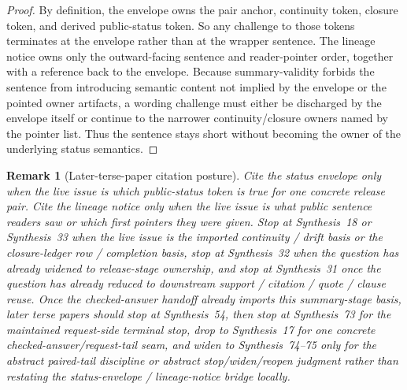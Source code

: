 \documentclass[11pt]{article}
\newtheorem{remark}{Remark}
\begin{document}
\begin{proof}
By definition, the envelope owns the pair anchor, continuity token, closure token, and derived public-status token.
So any challenge to those tokens terminates at the envelope rather than at the wrapper sentence.
The lineage notice owns only the outward-facing sentence and reader-pointer order, together with a reference back to the envelope.
Because summary-validity forbids the sentence from introducing semantic content not implied by the envelope or the pointed owner artifacts, a wording challenge must either be discharged by the envelope itself or continue to the narrower continuity/closure owners named by the pointer list.
Thus the sentence stays short without becoming the owner of the underlying status semantics.
\end{proof}

\begin{remark}[Later-terse-paper citation posture]
Cite the status envelope only when the live issue is \emph{which public-status token is true} for one concrete release pair.
Cite the lineage notice only when the live issue is \emph{what public sentence readers saw} or \emph{which first pointers they were given}.
Stop at Synthesis~18 or Synthesis~33 when the live issue is the imported continuity / drift basis or the closure-ledger row / completion basis, stop at Synthesis~32 when the question has already widened to release-stage ownership, and stop at Synthesis~31 once the question has already reduced to downstream support / citation / quote / clause reuse.
Once the checked-answer handoff already imports this summary-stage basis, later terse papers should stop at Synthesis~54, then stop at Synthesis~73 for the maintained request-side terminal stop, drop to Synthesis~17 for one concrete checked-answer/request-tail seam, and widen to Synthesis~74--75 only for the abstract paired-tail discipline or abstract stop/widen/reopen judgment rather than restating the status-envelope / lineage-notice bridge locally.\cite{series:planstateequiv,series:releaseclosure,series:releasespine,series:downstreamnormalforms,series:challengeanswerreviewmenus,series:pairedterminalcitationdiscipline,series:pairedterminalcutoverrules,series:workedexample}
\end{remark}
\end{document}

